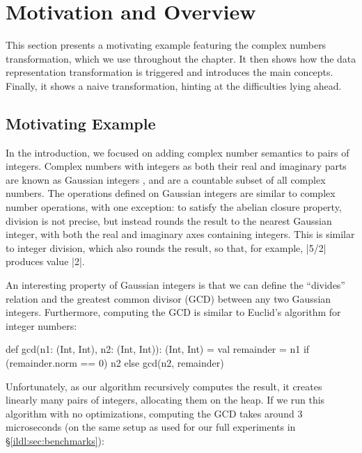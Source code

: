 

\section{Motivation and Overview}
\label{ildl:sec:problem}



This section presents a motivating example featuring the complex numbers transformation, which we use throughout the chapter. It then shows how the data representation transformation is triggered and introduces the main concepts. Finally, it shows a naive transformation, hinting at the difficulties lying ahead.



\subsection{Motivating Example}



In the introduction, we focused on adding complex number semantics to pairs of integers. Complex numbers with integers as both their real and imaginary parts are known as Gaussian integers \cite{gauss1828theoria,gaussian-integers-wikipedia}, and are a countable subset of all complex numbers. The operations defined on Gaussian integers are similar to complex number operations, with one
exception: to satisfy the abelian closure property, division is not precise, but instead rounds the result to the nearest Gaussian integer, with both the real and imaginary axes containing integers. This is similar to integer division, which also rounds the result, so that, for example, |5/2| produces value |2|.

An interesting property of Gaussian integers is that we can define the ``divides'' relation and the greatest common divisor (GCD) between any two Gaussian integers. Furthermore, computing the GCD is similar to
Euclid's algorithm for integer numbers:

\begin{lstlisting-nobreak}
def gcd(n1: (Int, Int), n2: (Int, Int)): (Int, Int) = {
  val remainder = n1 %
  if (remainder.norm == 0) n2 else gcd(n2, remainder)
}
\end{lstlisting-nobreak}

Unfortunately, as our algorithm recursively computes the result, it creates linearly many pairs of integers, allocating them on the heap. If we run this algorithm with no optimizations, computing the GCD takes around 3 microseconds (on the same setup as used for our full experiments in \S\ref{ildl:sec:benchmarks}):

